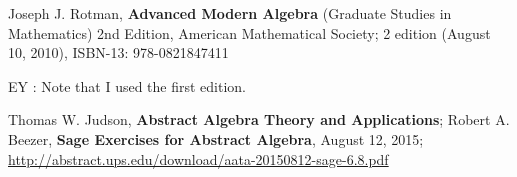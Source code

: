 \documentclass[twoside,landscape]{amsart}
\theoremstyle{plain}
\theoremstyle{definition}
\theoremstyle{remark}
\begin{document}
\begin{thebibliography}{9}
Joseph J. Rotman, \textbf{Advanced Modern Algebra} (Graduate Studies in Mathematics) 2nd Edition, American Mathematical Society; 2 edition (August 10, 2010), ISBN-13: 978-0821847411

EY : Note that I used the first edition.  

Thomas W. Judson, \textbf{Abstract Algebra Theory and Applications}; Robert A. Beezer, \textbf{Sage Exercises for Abstract Algebra}, August 12, 2015; \url{http://abstract.ups.edu/download/aata-20150812-sage-6.8.pdf}
\end{thebibliography}
\end{document}
